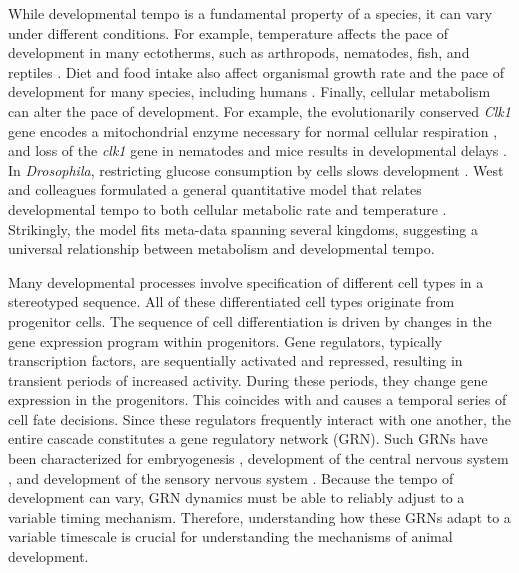 While developmental tempo is a fundamental property of a species, it can vary under different conditions. For example, temperature affects the pace of development in many ectotherms, such as arthropods, nematodes, fish, and reptiles \cite{Atlas1935,Davidson1944,Kuntz2014,Zuo2011}. Diet and food intake also affect organismal growth rate and the pace of development for many species, including humans \cite{Arendt1997,Brown2004,Metcalfe2001,Pontzer2016}. Finally, cellular metabolism can alter the pace of development. For example, the evolutionarily conserved \textit{Clk1} gene encodes a mitochondrial enzyme necessary for normal cellular respiration \cite{Felkai1999}, and loss of the \textit{clk1} gene in nematodes and mice results in developmental delays \cite{Levavasseur2001,Nakai2001,Wong1995}. In \textit{Drosophila}, restricting glucose consumption by cells slows development \cite{Brogiolo2001,Layalle2008,Rulifson2002,Shingleton2005}. West and colleagues formulated a general quantitative model that relates developmental tempo to both cellular metabolic rate and temperature \cite{Gillooly2002}. Strikingly, the model fits meta-data spanning several kingdoms, suggesting a universal relationship between metabolism and developmental tempo.

Many developmental processes involve specification of different cell types in a stereotyped sequence. All of these differentiated cell types originate from progenitor cells. The sequence of cell differentiation is driven by changes in the gene expression program within progenitors. Gene regulators, typically transcription factors, are sequentially activated and repressed, resulting in transient periods of increased activity. During these periods, they change gene expression in the progenitors. This coincides with and causes a temporal series of cell fate decisions. Since these regulators frequently interact with one another, the entire cascade constitutes a gene regulatory network (GRN). Such GRNs have been characterized for embryogenesis \cite{Cusanovich2018,Lawrence1992}, development of the central nervous system \cite{Kohwi2013}, and development of the sensory nervous system \cite{Cepko2014}. Because the tempo of development can vary, GRN dynamics must be able to reliably adjust to a variable timing mechanism. Therefore, understanding how these GRNs adapt to a variable timescale is crucial for understanding the mechanisms of animal development.


